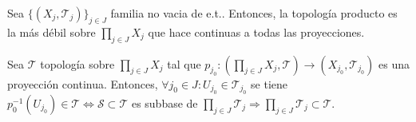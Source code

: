 \begin{prop}
  Sea $\{ ( X_{j}, \mathcal{T}_{j} ) \}_{j \in J}$ familia no vacia de e.t.. Entonces, la topología producto es la más débil sobre $\prod_{j \in J} X_{j}$ que hace continuas a todas las proyecciones.
\end{prop}

\begin{dem}
  Sea $\mathcal{T}$ topología sobre $ \prod_{j \in J} X_{j}$ tal que $p_{j_{0}}: ( \prod_{j \in J} X_{j}, \mathcal{T} ) \to ( X_{j_{0}}, \mathcal{T}_{j_{0}} )$ es una proyección continua. Entonces, $\forall j_{0} \in J: U_{j_{0}} \in \mathcal{T}_{j_{0}}$ se tiene $p_{0}^{-1}(U_{j_{0}}) \in \mathcal{T} \Leftrightarrow \mathcal{S} \subset \mathcal{T}$ es subbase de $\prod_{j \in J} \mathcal{T}_{j} \Rightarrow \prod_{j \in J} \mathcal{T}_{j} \subset \mathcal{T}$.
\end{dem}

